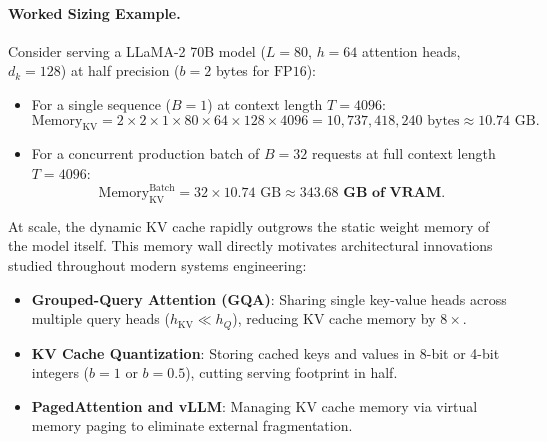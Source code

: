 \documentclass[../../../main.tex]{subfiles}
\begin{document}
\paragraph{Worked Sizing Example.}
Consider serving a LLaMA-2 70B model ($L = 80$, $h = 64$ attention heads, $d_k = 128$) at half precision ($b = 2$ bytes for $\text{FP16}$):
\begin{itemize}
    \item For a single sequence ($B = 1$) at context length $T = 4096$:
    \begin{equation}
    \text{Memory}_{\text{KV}} = 2 \times 2 \times 1 \times 80 \times 64 \times 128 \times 4096 = 10{,}737{,}418{,}240 \text{ bytes} \approx 10.74\text{ GB}.
    \end{equation}
    \item For a concurrent production batch of $B = 32$ requests at full context length $T = 4096$:
    \begin{equation}
    \text{Memory}_{\text{KV}}^{\text{Batch}} = 32 \times 10.74\text{ GB} \approx \mathbf{343.68\text{ GB of VRAM}}.
    \end{equation}
\end{itemize}
At scale, the dynamic KV cache rapidly outgrows the static weight memory of the model itself. This memory wall directly motivates architectural innovations studied throughout modern systems engineering:
\begin{itemize}
    \item \textbf{Grouped-Query Attention (GQA)}: Sharing single key-value heads across multiple query heads ($h_{\text{KV}} \ll h_Q$), reducing KV cache memory by $8\times$.
    \item \textbf{KV Cache Quantization}: Storing cached keys and values in 8-bit or 4-bit integers ($b = 1$ or $b = 0.5$), cutting serving footprint in half.
    \item \textbf{PagedAttention and vLLM}: Managing KV cache memory via virtual memory paging to eliminate external fragmentation.
\end{itemize}
\end{document}
